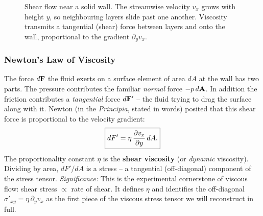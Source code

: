 \documentclass[../main.tex]{subfiles}
\begin{document}
\begin{figure}[h]
\centering
{}
\caption{Shear flow near a solid wall. The streamwise velocity $v_x$ grows with height $y$, so neighbouring layers slide past one another. Viscosity transmits a tangential (shear) force between layers and onto the wall, proportional to the gradient $\partial_y v_x$.}
\label{fig:lec18_shear}
\end{figure}

\subsubsection*{Newton's Law of Viscosity}
The force $d\mathbf{F}$ the fluid exerts on a surface element of area $dA$ at the wall has two parts. The pressure contributes the familiar \emph{normal} force $-p\,d\mathbf{A}$. In addition the friction contributes a \emph{tangential} force $d\mathbf{F}'$ -- the fluid trying to drag the surface along with it. Newton (in the \emph{Principia}, stated in words) posited that this shear force is proportional to the velocity gradient:
\begin{equation}
  \boxed{dF' = \eta\,\pdv{v_x}{y}\,dA.}
  \label{eq:lec18_newton_law}
\end{equation}
The proportionality constant $\eta$ is the \textbf{shear viscosity} (or \emph{dynamic} viscosity). Dividing by area, $dF'/dA$ is a stress -- a tangential (off-diagonal) component of the stress tensor.
\textit{Significance:} This is the experimental cornerstone of viscous flow: shear stress $\propto$ rate of shear. It defines $\eta$ and identifies the off-diagonal $\sigma'_{xy}=\eta\,\partial_y v_x$ as the first piece of the viscous stress tensor we will reconstruct in full.
\end{document}
